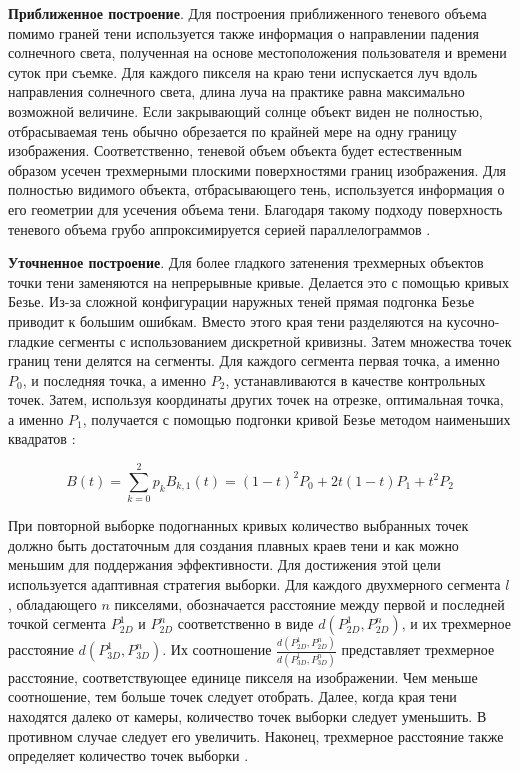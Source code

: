 \textbf{Приближенное построение}. Для построения приближенного теневого объема помимо граней тени используется также информация о направлении падения солнечного света, полученная на основе местоположения пользователя и времени суток при съемке. Для каждого пикселя на краю тени испускается луч вдоль направления солнечного света, длина луча на практике равна максимально возможной величине. Если закрывающий солнце объект виден не полностью, отбрасываемая тень обычно обрезается по крайней мере на одну границу изображения. Соответственно,  теневой объем объекта будет естественным образом усечен трехмерными плоскими поверхностями границ изображения. Для полностью видимого объекта, отбрасывающего тень, используется информация о его геометрии для усечения объема тени. Благодаря такому подходу поверхность теневого объема грубо аппроксимируется серией параллелограммов \cite{wei2019simulating}.

\textbf{Уточненное построение}. Для более гладкого затенения трехмерных объектов точки тени заменяются на непрерывные кривые. Делается это с помощью кривых Безье. Из-за сложной конфигурации наружных теней прямая подгонка Безье приводит к большим ошибкам. Вместо этого края тени разделяются на кусочно-гладкие сегменты с использованием дискретной кривизны. Затем множества точек границ тени делятся на сегменты. Для каждого сегмента первая точка, а именно $P_0$, и последняя точка, а именно $P_2$, устанавливаются в качестве контрольных точек. Затем, используя координаты других точек на отрезке, оптимальная точка, а именно $P_1$, получается с помощью подгонки кривой Безье методом наименьших квадратов \cite{wei2019simulating}:

\begin{equation}
	B(t) = \sum_{k=0}^{2} p_k B_{k, 1} (t) = (1 - t) ^ 2 P_0 + 2t(1 - t)P_1 + t^2 P_2
\end{equation}

При повторной выборке подогнанных кривых количество выбранных точек должно быть достаточным для создания плавных краев тени и как можно меньшим для поддержания эффективности. Для достижения этой цели используется адаптивная стратегия выборки. Для каждого двухмерного сегмента $l$, обладающего $n$ пикселями, обозначается расстояние между первой и последней точкой сегмента $P_{2D}^1$ и $P_{2D}^n$ соответственно в виде $d(P_{2D}^1, P_{2D}^n)$, и их трехмерное расстояние $d(P_{3D}^1, P_{3D}^n)$. Их соотношение $\frac{d(P_{2D}^1, P_{2D}^n)}{d(P_{3D}^1, P_{3D}^n)}$ представляет трехмерное расстояние, соответствующее единице пикселя на изображении. Чем меньше соотношение, тем больше точек следует отобрать. Далее, когда края тени находятся далеко от камеры, количество точек выборки следует уменьшить. В противном случае следует его увеличить. Наконец, трехмерное расстояние также определяет количество точек выборки \cite{wei2019simulating}.

